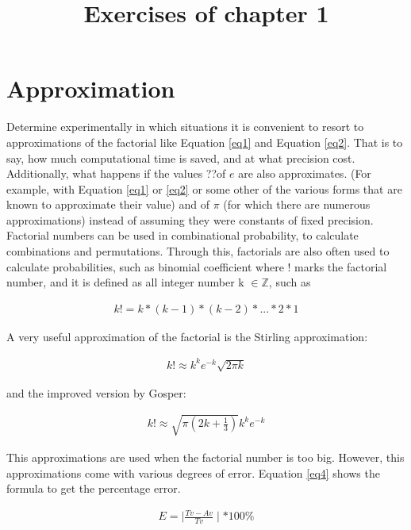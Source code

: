 \documentclass{article}
\begin{document}
\title{Exercises of chapter 1}

\maketitle

\section{Approximation}

Determine experimentally in which situations it is convenient to resort to approximations of the factorial like Equation \ref{eq1} and Equation \ref{eq2}. That is to say, how much computational time is saved, and at what precision cost. Additionally, what happens if the values ??of $e$ are also approximates. (For example, with Equation \ref{eq1} or \ref{eq2} or some other of the various forms that are known to approximate their value) and of $\pi$ (for which there are numerous approximations) instead of assuming they were constants of fixed precision.\\

Factorial numbers can be used in combinational probability, to calculate combinations and permutations. Through this, factorials are also often used to calculate probabilities, such as binomial coefficient  where ! marks the factorial number, and it is defined as all integer number k $\in \mathbb{Z}$, such as

\begin{eqnarray}
\label{eq3}
k! = k * (k - 1) * (k - 2) *... * 2 *1
\end{eqnarray}

A very useful approximation  of the factorial is the Stirling approximation:

\begin{eqnarray}
\label{eq1}
k! \approx k^{k} e^{-k} \sqrt{2\pi k}	
\end{eqnarray}

and the improved version by Gosper:

\begin{eqnarray}
\label{eq2}
k! \approx \sqrt{\pi (2k + \frac{1}{3})} k^{k} e^{-k}
\end{eqnarray}

This approximations are used when the factorial number is too big. However, this approximations come with various degrees of error. Equation \ref{eq4} shows the formula to get the percentage error.

\begin{eqnarray}
\label{eq4}
E = \mid \frac{Tv - Av}{Tv}	 \mid * 100\%
\end{eqnarray}
\end{document}
